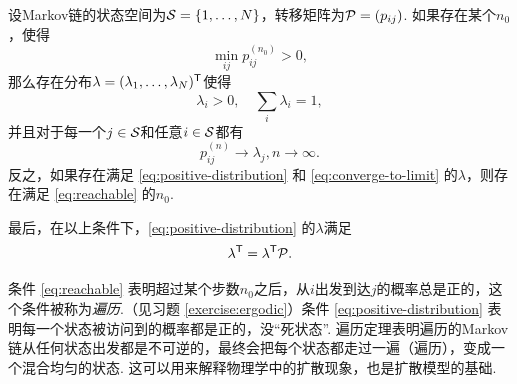 \begin{theorem}[遍历定理]\label{theorem:ergodic-theorem}
    设Markov链的状态空间为$\mathcal S=\{1,\dots,N\}$，转移矩阵为$\mathcal P=(p_{ij})$. 如果存在某个$n_0$，使得
    \begin{equation}
        \min_{ij}p_{ij}^{(n_0)}>0,\label{eq:reachable}
    \end{equation}
    那么存在分布$\lambda=(\lambda_1,\dots,\lambda_N)^{\mathsf{T}}$使得
    \begin{equation}
        \lambda_i>0,\quad\sum_i\lambda_i=1,\label{eq:positive-distribution}
    \end{equation}
    并且对于每一个$j\in\mathcal S$和任意$i\in\mathcal S$都有
    \begin{equation}
    p_{ij}^{(n)}\to\lambda_j,n\to\infty.\label{eq:converge-to-limit}
    \end{equation}
    反之，如果存在满足 \eqref{eq:positive-distribution} 和 \eqref{eq:converge-to-limit} 的$\lambda$，则存在满足 \eqref{eq:reachable} 的$n_0$.

    最后，在以上条件下，\eqref{eq:positive-distribution} 的$\lambda$满足
    \begin{equation}
        \lambda^{\mathsf{T}} = \lambda^{\mathsf{T}}\mathcal P.\label{eq:stationary}
    \end{equation}
\end{theorem}

条件 \eqref{eq:reachable} 表明超过某个步数$n_0$之后，从$i$出发到达$j$的概率总是正的，这个条件被称为\textit{遍历}.（见习题 \ref{exercise:ergodic}）条件 \eqref{eq:positive-distribution} 表明每一个状态被访问到的概率都是正的，没“死状态”. 遍历定理表明遍历的Markov链从任何状态出发都是不可逆的，最终会把每个状态都走过一遍（遍历），变成一个混合均匀的状态. 这可以用来解释物理学中的扩散现象，也是扩散模型的基础.


